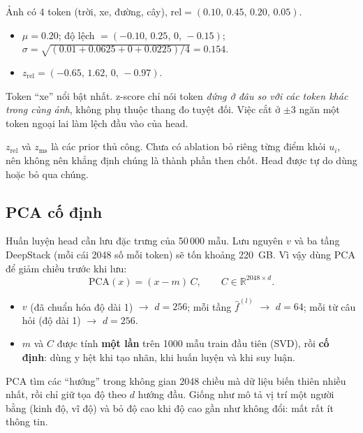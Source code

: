 \documentclass[11pt,a4paper]{article}
\newcommand{\R}{\mathbb{R}}
\begin{document}
\begin{vidu}
Ảnh có 4 token (trời, xe, đường, cây), $\mathrm{rel}=(0.10,\,0.45,\,0.20,\,0.05)$.
\begin{itemize}
\item $\mu=0.20$; độ lệch $=(-0.10,\,0.25,\,0,\,-0.15)$; $\sigma=\sqrt{(0.01+0.0625+0+0.0225)/4}=0.154$.
\item $z_\text{rel}=(-0.65,\,1.62,\,0,\,-0.97)$.
\end{itemize}
Token ``xe'' nổi bật nhất. z-score chỉ nói token \emph{đứng ở đâu so với các token khác trong cùng ảnh}, không phụ thuộc thang đo tuyệt đối. Việc cắt ở $\pm3$ ngăn một token ngoại lai làm lệch đầu vào của head.
\end{vidu}

\begin{luuy}
$z_\text{rel}$ và $z_\text{ms}$ là các prior thủ công. Chưa có ablation bỏ riêng từng điểm khỏi $u_i$, nên không nên khẳng định chúng là thành phần then chốt. Head được tự do dùng hoặc bỏ qua chúng.
\end{luuy}

\subsection{PCA cố định}
\label{sec:pca}
Huấn luyện head cần lưu đặc trưng của 50\,000 mẫu. Lưu nguyên $v$ và ba tầng DeepStack (mỗi cái 2048 số mỗi token) sẽ tốn khoảng 220~GB. Vì vậy dùng PCA để giảm chiều trước khi lưu:
\begin{equation}
\mathrm{PCA}(x)=(x-m)\,C,\qquad C\in\R^{2048\times d}.
\end{equation}
\begin{itemize}[leftmargin=*]
\item $v$ (đã chuẩn hóa độ dài 1) $\to$ $d=256$; mỗi tầng $\hat f^{(l)}$ $\to$ $d=64$; mỗi từ câu hỏi (độ dài 1) $\to$ $d=256$.
\item $m$ và $C$ được tính \textbf{một lần} trên 1000 mẫu train đầu tiên (SVD), rồi \textbf{cố định}: dùng y hệt khi tạo nhãn, khi huấn luyện và khi suy luận.
\end{itemize}

\begin{trucgiac}
PCA tìm các ``hướng'' trong không gian 2048 chiều mà dữ liệu biến thiên nhiều nhất, rồi chỉ giữ tọa độ theo $d$ hướng đầu. Giống như mô tả vị trí một người bằng (kinh độ, vĩ độ) và bỏ độ cao khi độ cao gần như không đổi: mất rất ít thông tin.
\end{trucgiac}
\end{document}

